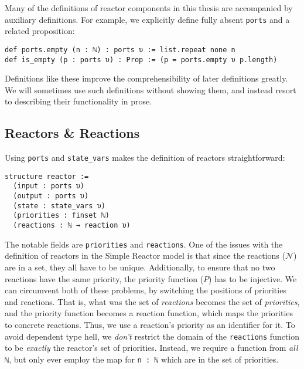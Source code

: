 \vspace{3mm}

\noindent Many of the definitions of reactor components in this thesis are accompanied by auxiliary definitions.
For example, we explicitly define fully absent \lstinline{ports} and a related proposition:

\begin{lstlisting} 
def ports.empty (n : ℕ) : ports υ := list.repeat none n
def is_empty (p : ports υ) : Prop := (p = ports.empty υ p.length)
\end{lstlisting}

\noindent Definitions like these improve the comprehensibility of later definitions greatly.
We will sometimes use such definitions without showing them, and instead resort to describing their functionality in prose. 

\subsection{Reactors \& Reactions}

Using \lstinline{ports} and \lstinline{state_vars} makes the definition of reactors straightforward:

\begin{lstlisting}
structure reactor :=
  (input : ports υ)
  (output : ports υ)
  (state : state_vars υ)
  (priorities : finset ℕ)
  (reactions : ℕ → reaction υ)
\end{lstlisting}

\noindent The notable fields are \lstinline{priorities} and \lstinline{reactions}.
One of the issues with the definition of reactors in the Simple Reactor model is that since the reactions ($\mathcal{N}$) are in a set, they all have to be unique.
Additionally, to ensure that no two reactions have the same priority, the priority function ($P$) has to be injective.
We can circumvent both of these problems, by switching the positions of priorities and reactions.
That is, what was the set of \emph{reactions} becomes the set of \emph{priorities}, and the priority function becomes a reaction function, which maps the priorities to concrete reactions.
Thus, we use a reaction's priority as an identifier for it.
To avoid dependent type hell, we \emph{don't} restrict the domain of the \lstinline{reactions} function to be \emph{exactly} the reactor's set of priorities.
Instead, we require a function from \emph{all} \lstinline{ℕ}, but only ever employ the map for \lstinline{n : ℕ} which are in the set of priorities.

